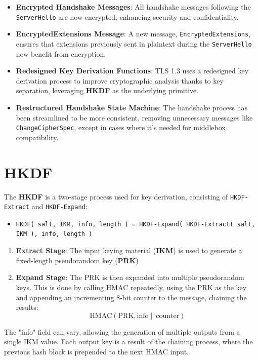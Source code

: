 \begin{itemize}
    \item \textbf{Encrypted Handshake Messages}: All handshake messages following the \texttt{ServerHello} are now encrypted, enhancing security and confidentiality.
    \item \textbf{EncryptedExtensions Message}: A new message, \texttt{EncryptedExtensions}, ensures that extensions previously sent in plaintext during the \texttt{ServerHello} now benefit from encryption.
    \item \textbf{Redesigned Key Derivation Functions}: TLS 1.3 uses a redesigned key derivation process to improve cryptographic analysis thanks to key separation, leveraging \textbf{HKDF} as the underlying primitive.
    \item \textbf{Restructured Handshake State Machine}: The handshake process has been streamlined to be more consistent, removing unnecessary messages like \texttt{ChangeCipherSpec}, except in cases where it's needed for middlebox compatibility.
\end{itemize}

\section{HKDF}

The \textbf{HKDF} is a two-stage process used for key derivation, consisting of \texttt{HKDF-Extract} and \texttt{HKDF-Expand}:

\begin{itemize}
    \item \texttt{HKDF( salt, IKM, info, length ) = HKDF-Expand( HKDF-Extract( salt, IKM ), info, length )}
\end{itemize}

\begin{enumerate}
    \item \textbf{Extract Stage}: The input keying material (\textbf{IKM}) is used to generate a fixed-length pseudorandom key (\textbf{PRK})
    
    \item \textbf{Expand Stage}: The PRK is then expanded into multiple pseudorandom keys. This is done by calling HMAC repeatedly, using the PRK as the key and appending an incrementing 8-bit counter to the message, chaining the results:
    \[
    \text{HMAC}(\text{PRK}, \text{info} \parallel \text{counter})
    \]
\end{enumerate}

The "info" field can vary, allowing the generation of multiple outputs from a single IKM value. Each output key is a result of the chaining process, where the previous hash block is prepended to the next HMAC input.

